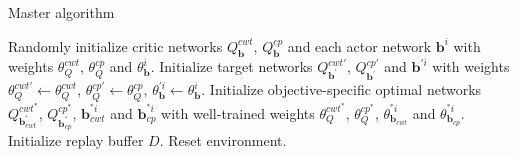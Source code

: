 \documentclass[sigconf]{acmart}
\newcommand{\stddpg}{{\sc Master}\xspace}
\begin{document}
\begin{algorithm}[tb] 
	\caption{ \stddpg algorithm} 
	\label{alg:master} 
	\begin{algorithmic}[1] 
		\State Randomly initialize critic networks $Q_{\bm{b}}^{cwt}$, $Q_{\bm{b}}^{cp}$ and  each actor network $\bm{b}^i$ with weights $\theta_Q^{cwt}$, $\theta_Q^{cp}$ and $\theta_{\bm{b}}^i$.
		\State Initialize target networks $Q_{\bm{b}^{'}}^{cwt'}$, $Q_{\bm{b}^{'}}^{cp'}$ and $\bm{b}^{'i}$ with weights $\theta_Q^{cwt'} \leftarrow \theta_Q^{cwt}$, $\theta_Q^{cp'} \leftarrow \theta_Q^{cp}$, $\theta_{\bm{b}}^{'i} \leftarrow \theta_{\bm{b}}^i$.
		\State Initialize objective-specific optimal networks $Q_{\bm{b}_{cwt}^{^*}}^{cwt^*}$, $Q_{\bm{b}_{cp}^{^*}}^{cp^*}$, $\bm{b}_{cwt}^{^*i}$ and $\bm{b}_{cp}^{^*i}$ with well-trained weights $\theta_Q^{cwt^*}$, $\theta_Q^{cp^*}$, $\theta_{\bm{b}_{cwt}}^{^*i}$ and $\theta_{\bm{b}_{cp}}^{^*i}$.
		\State Initialize replay buffer $D$.
		\State Reset environment.
		

\end{algorithmic}
\end{algorithm}
\end{document}
